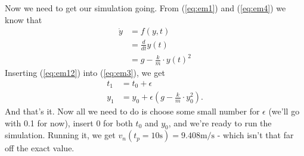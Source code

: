 \documentclass[paper=a4, fontsize=11pt]{scrartcl} %
\numberwithin{equation}{section} %
\numberwithin{figure}{section} %
\numberwithin{table}{section} %
\begin{document}
Now we need to get our simulation going. From (\ref{eq:em1}) and (\ref{eq:em4}) we know that
\begin{align} 
  \dot{y} &= f(y, t)  \\
   &= \frac{d}{dt} y(t)  \\
   &= g - \frac{k}{m} \cdot y(t)^2 \label{eq:em12}
\end{align}
Inserting (\ref{eq:em12}) into (\ref{eq:em3}), we get
\begin{align} \label{eq:em3}
  t_1 &= t_0 + \epsilon \\
  y_1 &= y_0 + \epsilon \left(g - \frac{k}{m} \cdot y_0^2\right).
\end{align}
And that's it. Now all we need to do is choose some small number for $\epsilon$ (we'll go with 0.1 for now), insert 0 for both $t_0$ and $y_0$, 
and we're ready to run the simulation. Running it, we get $v_n(t_p = 10\si{\second}) = 9.408 \si{\meter\per\second}$ - which isn't that far off the exact value.
\end{document}
